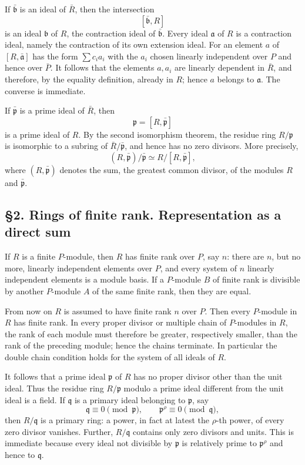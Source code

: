 \documentclass[11pt]{article}
\begin{document}
If \(\bar{\mathfrak b}\) is an ideal of \(\bar R\), then the
intersection \[
  [\bar{\mathfrak b},R]
\] is an ideal \(\mathfrak b\) of \(R\), the contraction ideal of
\(\bar{\mathfrak b}\). Every ideal \(\mathfrak a\) of \(R\) is a
contraction ideal, namely the contraction of its own extension ideal.
For an element \(a\) of \([R,\bar{\mathfrak a}]\) has the form
\(\sum c_i a_i\) with the \(a_i\) chosen linearly independent over \(P\)
and hence over \(\bar P\). It follows that the elements \(a,a_i\) are
linearly dependent in \(\bar R\), and therefore, by the equality
definition, already in \(R\); hence \(a\) belongs to \(\mathfrak a\).
The converse is immediate.

If \(\bar{\mathfrak p}\) is a prime ideal of \(\bar R\), then \[
  \mathfrak p=[R,\bar{\mathfrak p}]
\] is a prime ideal of \(R\). By the second isomorphism theorem, the
residue ring \(R/\mathfrak p\) is isomorphic to a subring of
\(\bar R/\bar{\mathfrak p}\), and hence has no zero divisors. More
precisely, \[
  (R,\bar{\mathfrak p})/\bar{\mathfrak p}
  \simeq R/[R,\bar{\mathfrak p}],
\] where \((R,\bar{\mathfrak p})\) denotes the sum, the greatest common
divisor, of the modules \(R\) and \(\bar{\mathfrak p}\).

\subsection{§2. Rings of finite rank. Representation as a direct
sum}\label{rings-of-finite-rank.-representation-as-a-direct-sum}

If \(R\) is a finite \(P\)-module, then \(R\) has finite rank over
\(P\), say \(n\): there are \(n\), but no more, linearly independent
elements over \(P\), and every system of \(n\) linearly independent
elements is a module basis. If a \(P\)-module \(B\) of finite rank is
divisible by another \(P\)-module \(A\) of the same finite rank, then
they are equal.

From now on \(R\) is assumed to have finite rank \(n\) over \(P\). Then
every \(P\)-module in \(R\) has finite rank. In every proper divisor or
multiple chain of \(P\)-modules in \(R\), the rank of each module must
therefore be greater, respectively smaller, than the rank of the
preceding module; hence the chains terminate. In particular the double
chain condition holds for the system of all ideals of \(R\).

It follows that a prime ideal \(\mathfrak p\) of \(R\) has no proper
divisor other than the unit ideal. Thus the residue ring
\(R/\mathfrak p\) modulo a prime ideal different from the unit ideal is
a field. If \(\mathfrak q\) is a primary ideal belonging to
\(\mathfrak p\), say \[
  \mathfrak q\equiv0\pmod{\mathfrak p},
  \qquad
  \mathfrak p^{\rho}\equiv0\pmod{\mathfrak q},
\] then \(R/\mathfrak q\) is a primary ring: a power, in fact at latest
the \(\rho\)-th power, of every zero divisor vanishes. Further,
\(R/\mathfrak q\) contains only zero divisors and units. This is
immediate because every ideal not divisible by \(\mathfrak p\) is
relatively prime to \(\mathfrak p^{\rho}\) and hence to \(\mathfrak q\).
\end{document}
